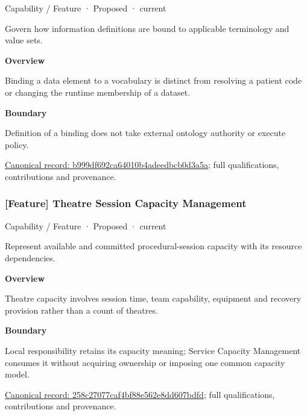 \label{element:b999df692ca64010b4adeedbcb0d3a5a}
{\small Capability / Feature · Proposed · current}\par

Govern how information definitions are bound to applicable terminology and value sets.



\textbf{Overview}



Binding a data element to a vocabulary is distinct from resolving a patient code or changing the runtime membership of a dataset.



\textbf{Boundary}



Definition of a binding does not take external ontology authority or execute policy.


{\footnotesize \href{../../../../continuum/strategy/capability/feature/b999df692ca64010b4adeedbcb0d3a5a.md}{Canonical record: b999df692ca64010b4adeedbcb0d3a5a}; full qualifications, contributions and provenance.}\par
\subsubsection{[Feature] Theatre Session Capacity Management}

\label{element:258c27077caf4bf88e562e8dd607bdfd}
{\small Capability / Feature · Proposed · current}\par

Represent available and committed procedural-session capacity with its resource dependencies.



\textbf{Overview}



Theatre capacity involves session time, team capability, equipment and recovery provision rather than a count of theatres.



\textbf{Boundary}



Local responsibility retains its capacity meaning; Service Capacity Management consumes it without acquiring ownership or imposing one common capacity model.


{\footnotesize \href{../../../../continuum/strategy/capability/feature/258c27077caf4bf88e562e8dd607bdfd.md}{Canonical record: 258c27077caf4bf88e562e8dd607bdfd}; full qualifications, contributions and provenance.}\par
